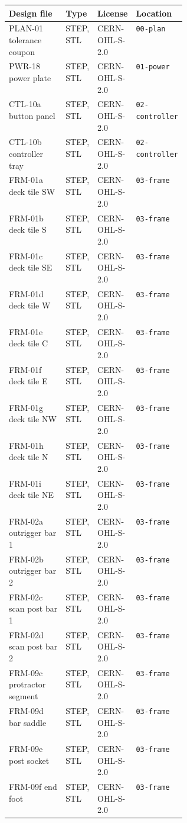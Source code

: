 \begin{tabular}{p{0.35\linewidth}lll}
\textbf{Design file} & \textbf{Type} & \textbf{License} & \textbf{Location} \\ \hline
PLAN-01 tolerance coupon & STEP, STL & CERN-OHL-S-2.0 & \texttt{00-plan} \\
PWR-18 power plate & STEP, STL & CERN-OHL-S-2.0 & \texttt{01-power} \\
CTL-10a button panel & STEP, STL & CERN-OHL-S-2.0 & \texttt{02-controller} \\
CTL-10b controller tray & STEP, STL & CERN-OHL-S-2.0 & \texttt{02-controller} \\
FRM-01a deck tile SW & STEP, STL & CERN-OHL-S-2.0 & \texttt{03-frame} \\
FRM-01b deck tile S & STEP, STL & CERN-OHL-S-2.0 & \texttt{03-frame} \\
FRM-01c deck tile SE & STEP, STL & CERN-OHL-S-2.0 & \texttt{03-frame} \\
FRM-01d deck tile W & STEP, STL & CERN-OHL-S-2.0 & \texttt{03-frame} \\
FRM-01e deck tile C & STEP, STL & CERN-OHL-S-2.0 & \texttt{03-frame} \\
FRM-01f deck tile E & STEP, STL & CERN-OHL-S-2.0 & \texttt{03-frame} \\
FRM-01g deck tile NW & STEP, STL & CERN-OHL-S-2.0 & \texttt{03-frame} \\
FRM-01h deck tile N & STEP, STL & CERN-OHL-S-2.0 & \texttt{03-frame} \\
FRM-01i deck tile NE & STEP, STL & CERN-OHL-S-2.0 & \texttt{03-frame} \\
FRM-02a outrigger bar 1 & STEP, STL & CERN-OHL-S-2.0 & \texttt{03-frame} \\
FRM-02b outrigger bar 2 & STEP, STL & CERN-OHL-S-2.0 & \texttt{03-frame} \\
FRM-02c scan post bar 1 & STEP, STL & CERN-OHL-S-2.0 & \texttt{03-frame} \\
FRM-02d scan post bar 2 & STEP, STL & CERN-OHL-S-2.0 & \texttt{03-frame} \\
FRM-09c protractor segment & STEP, STL & CERN-OHL-S-2.0 & \texttt{03-frame} \\
FRM-09d bar saddle & STEP, STL & CERN-OHL-S-2.0 & \texttt{03-frame} \\
FRM-09e post socket & STEP, STL & CERN-OHL-S-2.0 & \texttt{03-frame} \\
FRM-09f end foot & STEP, STL & CERN-OHL-S-2.0 & \texttt{03-frame} \\

\end{tabular}
